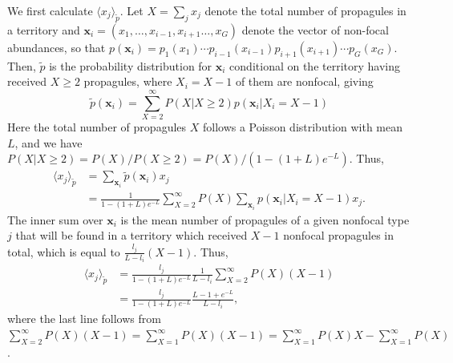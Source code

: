 \documentclass[12pt]{article}
\begin{document}
We first calculate $\langle x_j \rangle_{\tilde{p}}$. Let $X=\sum_j x_j$ denote the total number of propagules in a territory and ${\mathbf x_i}=(x_1,\ldots,x_{i-1},x_{i+1}\ldots,x_G)$ denote the vector of non-focal abundances, so that $p({\mathbf x_i})=p_1(x_1)\cdots p_{i-1}(x_{i-1})p_{i+1}(x_{i+1})\cdots p_G(x_G)$. Then, $\tilde{p}$ is the probability distribution for ${\mathbf x_i}$ conditional on the territory having received $X\geq 2$ propagules, where $X_i=X-1$ of them are nonfocal, giving
\begin{equation}
\tilde{p}({\mathbf x_i})=\sum_{X=2}^{\infty}P(X|X\geq 2) p({\mathbf x_i}|X_i=X-1)
\end{equation}
Here the total number of propagules $X$ follows a Poisson distribution with mean $L$, and we have $P(X|X\geq 2)=P(X)/P(X\geq 2)=P(X)/(1-(1+L)e^{-L})$. Thus,
\begin{align}
\langle x_j \rangle_{\tilde{p}}&=\sum_{\mathbf x_i} \tilde{p}({\mathbf x_i})x_j\nonumber\\
&=\frac{1}{1-(1+L)e^{-L}}\sum_{X=2}^{\infty} P(X) \sum_{\mathbf x_i} p({\mathbf x_i}|X_i=X-1)x_j.
\label{eq:raremonster1}
\end{align}
The inner sum over ${\mathbf x_i}$ is the mean number of propagules of a given nonfocal type $j$ that will be found in a territory which received $X-1$ nonfocal propagules in total, which is equal to $\frac{l_j}{L-l_i}(X-1)$. Thus, 
\begin{align}
\langle x_j \rangle_{\tilde{p}}&=\frac{l_j}{1-(1+L)e^{-L}}\frac{1}{L-l_i}\sum_{X=2}^{\infty} P(X) (X-1)\nonumber\\
&=\frac{l_j}{1-(1+L)e^{-L}}\frac{L-1+e^{-L}}{L-l_i},
\label{eq:meanxjrare}
\end{align}
where the last line follows from $\sum_{X=2}^{\infty} P(X)(X-1)=\sum_{X=1}^{\infty} P(X)(X-1)=\sum_{X=1}^{\infty} P(X)X-\sum_{X=1}^{\infty}P(X)$.
\end{document}
